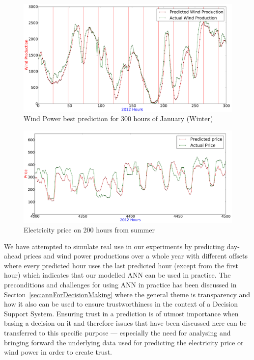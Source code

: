 \begin{figure}[ht!]
\centering
\includegraphics[width=0.99\linewidth]{billeder/bestPossiblePredictionWindProduction0-300.png}
\caption{Wind Power best prediction for 300 hours of January (Winter)}
\label{fig:abilityToPredictWindPower}
\end{figure}

\begin{figure}[ht!]
\centering
\includegraphics[width=\linewidth]{billeder/PriceExperimentalAnalysis/summer.jpg}
\caption{Electricity price on 200 hours from summer}
\label{fig:abilityToPredictElectricityPrice}
\end{figure}

We have attempted to simulate real use in our experiments by predicting day-ahead prices and wind power productions over a whole year with different offsets where every predicted hour uses the last predicted hour (except from the first hour) which indicates that our modelled ANN can be used in practice. The preconditions and challenges for using ANN in practice has been discussed in Section~\ref{sec:annForDecisionMaking} where the general theme is transparency and how it also can be used to ensure trustworthiness in the context of a Decision Support System. Ensuring trust in a prediction is of utmost importance when basing a decision on it and therefore issues that have been discussed here can be transferred to this specific purpose --- especially the need for analysing and bringing forward the underlying data used for predicting the electricity price or wind power in order to create trust.
 
